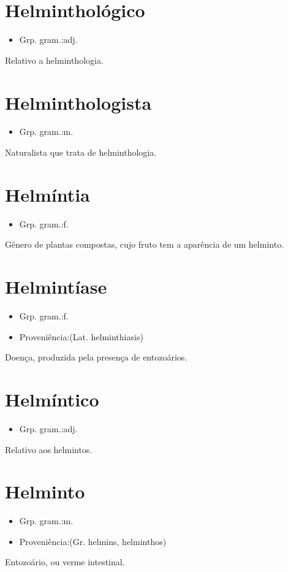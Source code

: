 \documentclass{article}
\begin{document}
\section{Helminthológico}
\begin{itemize}
\item {Grp. gram.:adj.}
\end{itemize}
Relativo a helminthologia.
\section{Helminthologista}
\begin{itemize}
\item {Grp. gram.:m.}
\end{itemize}
Naturalista que trata de helminthologia.
\section{Helmíntia}
\begin{itemize}
\item {Grp. gram.:f.}
\end{itemize}
Gênero de plantas compostas, cujo fruto tem a aparência de um helminto.
\section{Helmintíase}
\begin{itemize}
\item {Grp. gram.:f.}
\end{itemize}
\begin{itemize}
\item {Proveniência:(Lat. \textunderscore helminthiasis\textunderscore )}
\end{itemize}
Doença, produzida pela presença de entozoários.
\section{Helmíntico}
\begin{itemize}
\item {Grp. gram.:adj.}
\end{itemize}
Relativo aos helmintos.
\section{Helminto}
\begin{itemize}
\item {Grp. gram.:m.}
\end{itemize}
\begin{itemize}
\item {Proveniência:(Gr. \textunderscore helmins\textunderscore , \textunderscore helminthos\textunderscore )}
\end{itemize}
Entozoário, ou verme intestinal.
\end{document}

